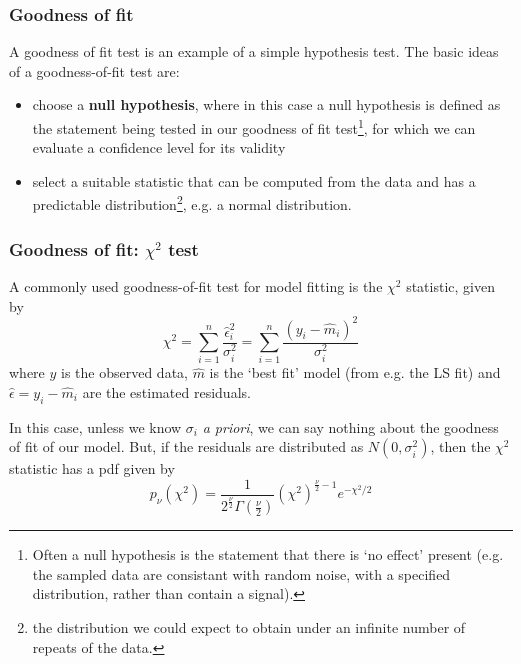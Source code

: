 \begin{frame}

\frametitle{Goodness of fit}
\label{goodnessoffit}

A goodness of fit test is an example of a simple hypothesis test. The basic ideas of a goodness-of-fit test are:

\begin{itemize}
\item choose a \textbf{null hypothesis}, where in this case a null hypothesis is defined as the statement being tested in our goodness of fit test\footnote{Often a null hypothesis is the statement that there is `no effect' present (e.g. the sampled
data are consistant with random noise, with a specified distribution, rather than contain a signal).}, for which we can evaluate a confidence level for its validity

\item select a suitable statistic that can be computed from the data and has a predictable distribution\footnote{the distribution we could expect to obtain under an infinite number of repeats of the data.}, e.g. a normal distribution.

\end{itemize}

\end{frame}

\begin{frame}

\frametitle{Goodness of fit: $\chi^2$ test}
\label{goodnessoffit:chi2test}

A commonly used goodness-of-fit test for model fitting is the $\chi^2$ statistic, given by
\[
\chi^2 = \sum_{i=1}^n \frac{\hat{\epsilon}^2_i}{\sigma_i^2} = \sum_{i=1}^n\frac{(y_i-\hat{m}_i)^2}{\sigma_i^2}
\]
where $y$ is the observed data, $\hat{m}$ is the `best fit' model (from e.g. the LS fit) and $\hat{\epsilon} = y_i-\hat{m}_i$ are the estimated residuals.

In this case, unless we know $\sigma_i$ \emph{a priori}, we can say nothing about the goodness of fit of our model. But,
if the residuals are distributed as $N(0, \sigma_i^2)$, then the $\chi^2$ statistic has a pdf given by
\[
p_{\nu}(\chi^2) = \frac{1}{2^{\frac{\nu}{2}}\Gamma\left(\frac{\nu}{2}\right)}\left(\chi^2\right)^{\frac{\nu}{2}-1}e^{-\chi^2/2}
\]

\end{frame}


